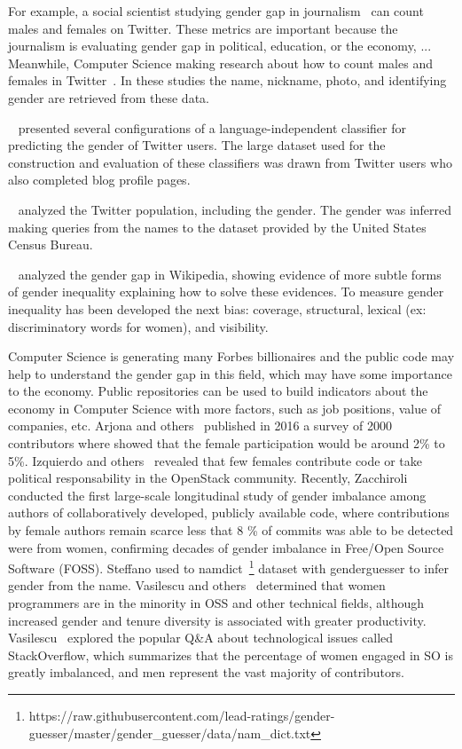 \documentclass[a4paper]{article}
\begin{document}
For example, a social scientist studying gender gap in
journalism~\cite{alvarez2012journalism} can count males and
females on Twitter. These metrics are important because the journalism
is evaluating gender gap in political, education, or the economy,
... Meanwhile, Computer Science making research about how to
count males and females in Twitter~\cite{burger2011discriminating}. In
these studies the name, nickname, photo, and identifying gender are
retrieved from these data.

~\cite{burger2011discriminating} presented several configurations of a
language-independent classifier for predicting the gender of Twitter
users. The large dataset used for the construction and evaluation of
these classifiers was drawn from Twitter users who also completed blog
profile pages.

~\cite{mislove2011understanding} analyzed the Twitter population,
including the gender. The gender was inferred making queries
from the names to the dataset provided by the United States Census
Bureau.

~\cite{wagner2015s} analyzed the gender gap in Wikipedia,
showing evidence of more subtle forms of gender inequality explaining
how to solve these evidences. To measure gender inequality has been
developed the next bias: coverage, structural, lexical (ex:
discriminatory words for women), and visibility.

Computer Science is generating many Forbes billionaires and the public
code may help to understand the gender gap in this field, which may
have some importance to the economy. Public repositories can
be used to build indicators about the economy in Computer Science with
more factors, such as job positions, value of companies, etc.
Arjona and others~\cite{10.1007/978-3-319-39225-7_13} published in 2016
a survey of 2000 contributors where showed that the female participation would be
around 2\% to 5\%. Izquierdo and others~\cite{izquierdo2018openstack}
revealed that few females contribute code or take political
responsability in the OpenStack community.
Recently, Zacchiroli~\cite{zacchiroli2020gender} conducted the first large-scale
longitudinal study of gender imbalance among authors of
collaboratively developed, publicly available code, where
contributions by female authors remain scarce less that 8 \% of
commits was able to be detected were from women, confirming decades of
gender imbalance in Free/Open Source Software (FOSS). Steffano used
to namdict~\footnote{https://raw.githubusercontent.com/lead-ratings/gender-guesser/master/gender\_guesser/data/nam\_dict.txt} dataset with genderguesser to infer gender from
the name. Vasilescu and others~\cite{vasilescu2015gender} determined
that women programmers are in the minority in OSS and other technical
fields, although increased gender and tenure diversity is associated
with greater productivity. Vasilescu~\cite{vasilescu2012gender}
explored the popular Q\&A about technological issues called
StackOverflow, which summarizes that the percentage of women engaged
in SO is greatly imbalanced, and men represent the vast majority of
contributors.
\end{document}
